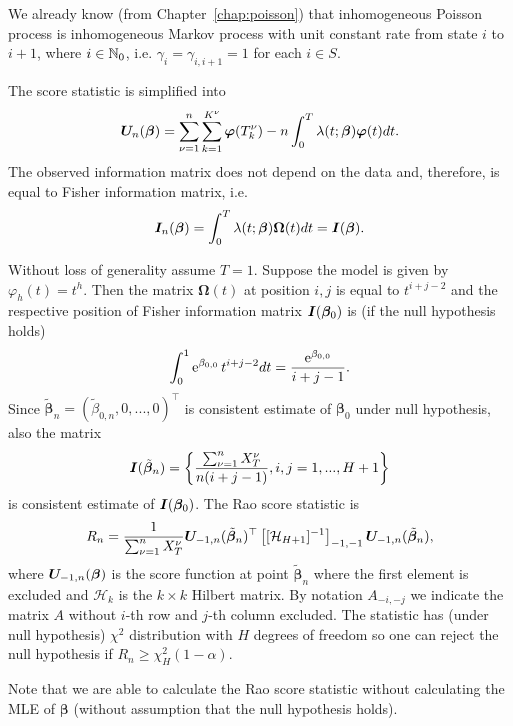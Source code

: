 {\begin{example}
	We already know (from Chapter~\ref{chap:poisson}) that inhomogeneous Poisson process is inhomogeneous Markov process with unit constant rate from state $i$ to $i+1$, where $i \in \mathbb{N}_0$, i.e. $\gamma_{i} = \gamma_{i,i+1} = 1$ for each $i \in S$. 
	
	The score statistic is simplified into
	\[
		\bm{U}_n (\bm{\beta})
		= \sum_{\nu=1}^n \sum_{k=1}^{K^{\nu}} \bm{\varphi} (T_k^{\nu})
		- n\int_{0}^{T} \lambda(t; \bm{\beta}) \bm{\varphi} (t) dt.
	\]
		The observed information matrix does not depend on the data and, therefore, is equal to Fisher information matrix, i.e. 
	\[
		\bm{I}_n (\bm{\beta}) =
		\int_{0}^{T} \lambda(t; \bm{\beta}) \bm{\Omega} (t) dt = 
		\bm{I} (\bm{\beta}).
	\]
	
		Without loss of generality assume $T = 1$. Suppose the model is given by $\varphi_h (t) = t^h$. Then the matrix $\bm{\Omega} (t)$ at position $i,j$ is equal to $t^{i+j-2}$ and the respective position of Fisher information matrix $\bm{I} (\bm{\beta}_0)$ is (if the null hypothesis holds)
		\[
			\int_0^1 \operatorname{\mathrm{e}}^{\beta_{0,0}} t^{i+j-2} dt = \frac{\operatorname{\mathrm{e}}^{\beta_{0,0}}}{i+j-1}.
		\]
		Since $\tilde{\bm{\beta}}_n = (\tilde{\beta}_{0,n}, 0, ..., 0)^{\top}$ is consistent estimate of $\bm{\beta}_0$ under null hypothesis, also the matrix
		\[
			\bm{I} (\tilde{\bm{\beta}}_n) = \left\{ \frac{\sum_{\nu = 1}^n X_T^{\nu}}{n (i+j-1)}, i,j = 1, ..., H+1 \right\}
		\]
		is consistent estimate of $\bm{I} (\bm{\beta}_0)$. The Rao score statistic is		
		\[
			R_n = \frac{1}{\sum_{\nu = 1}^n X_T^{\nu}} \bm{U}_{-1,n} (\tilde{\bm{\beta}}_n) ^{\top} \left[ [ \mathcal{H}_{H+1} ]^{-1} \right]_{-1,-1} \bm{U}_{-1,n} (\tilde{\bm{\beta}}_n),
		\]
		where $\bm{U}_{-1,n} (\bm{\beta})$ is the score function at point $\tilde{\bm{\beta}}_n$ where the first element is excluded and $\mathcal{H}_k$ is the $k \times k$ Hilbert matrix. By notation $A_{-i,-j}$ we indicate the matrix $A$ without $i$-th row and $j$-th column excluded. 
		The statistic has (under null hypothesis) $\chi^2$ distribution with $H$ degrees of freedom so one can reject the  null hypothesis if $R_n \geq \chi_H^2(1-\alpha)$.
		
		Note that we are able to calculate the Rao score statistic without calculating the MLE of $\bm{\beta}$ (without assumption that the null hypothesis holds).
		
	\demo
\end{example}




}
